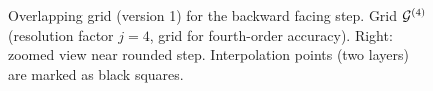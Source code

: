 \documentclass[11pt]{article}
\begin{document}
{
\begin{figure}[hbt]
\newcommand{\figWidth}{10cm}
\newcommand{\trimfig}[2]{\trimFigb{#1}{#2}{0.025}{.5}{.375}{.375}}
\newcommand{\figWidtha}{5.5cm}
\newcommand{\trimfiga}[2]{\trimFigb{#1}{#2}{0.0}{.0}{.0}{.0}}
\begin{center}\small
\caption{
Overlapping grid (version 1) 
for the backward facing step. Grid ${\mathcal G}^{(4)}$ (resolution factor $j=4$, grid for fourth-order accuracy). Right: zoomed view near rounded step.
Interpolation points (two layers) are marked as black squares.
}
\label{fig:backStepGrids}
\end{center}
\end{figure}
}


\end{document}
